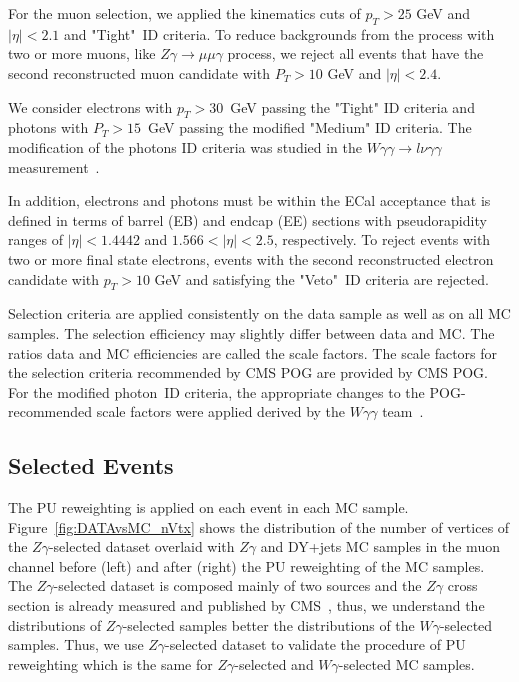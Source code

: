 For the muon selection, we applied the kinematics cuts of $p_T>25$ GeV and $|\eta|<2.1$ and "Tight"~ID criteria. To reduce backgrounds from the process with two or more muons, like $Z\gamma\rightarrow\mu\mu\gamma$ process, we reject all events that have the second reconstructed muon candidate with $P_T>10$ GeV and $|\eta|<2.4$. 

We consider electrons with $p_T>30$~GeV passing the "Tight" ID criteria and photons with $P_T>15$~GeV passing the modified "Medium" ID criteria. The modification of the photons ID criteria was studied in the $W\gamma\gamma \rightarrow l\nu\gamma\gamma$ measurement~\cite{ref_Wgg8TeV}. 

In addition, electrons and photons must be within the ECal acceptance that is defined in terms of barrel (EB) and endcap (EE) sections with pseudorapidity ranges of $|\eta| < 1.4442$ and $1.566 < |\eta| < 2.5$, respectively. To reject events with two or more final state electrons, events with the second reconstructed electron candidate with $p_T>10$ GeV and satisfying the "Veto"~ID criteria are rejected. %

Selection criteria are applied consistently on the data sample as well as on all MC samples. The selection efficiency may slightly differ between data and MC. The ratios data and MC efficiencies are called the scale factors. The scale factors for the selection criteria recommended by CMS POG are provided by CMS POG. For the modified photon~ID criteria, the appropriate changes to the POG-recommended scale factors were applied derived by the $W\gamma\gamma$ team~\cite{ref_Wgg8TeV}.



\subsection{Selected Events}


The PU reweighting is applied on each event in each MC sample. Figure~\ref{fig:DATAvsMC_nVtx} shows the distribution of the number of vertices of the $Z\gamma$-selected dataset overlaid with $Z\gamma$ and DY+jets MC samples in the muon channel before (left) and after (right) the PU reweighting of the MC samples. The $Z\gamma$-selected dataset is composed mainly of two sources and the $Z\gamma$ cross section is already measured and published by CMS~\cite{ref_Zg8TeV}, thus, we understand the distributions of $Z\gamma$-selected samples better the distributions of the $W\gamma$-selected samples. Thus, we use $Z\gamma$-selected dataset to validate the procedure of PU reweighting which is the same for $Z\gamma$-selected and $W\gamma$-selected MC samples.

